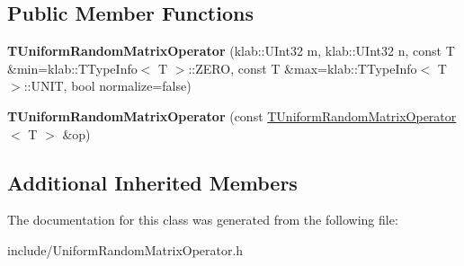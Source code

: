 \subsection*{Public Member Functions}
\begin{DoxyCompactItemize}
\item 
{\bfseries T\+Uniform\+Random\+Matrix\+Operator} (klab\+::\+U\+Int32 m, klab\+::\+U\+Int32 n, const T \&min=klab\+::\+T\+Type\+Info$<$ T $>$\+::Z\+E\+RO, const T \&max=klab\+::\+T\+Type\+Info$<$ T $>$\+::U\+N\+IT, bool normalize=false)\hypertarget{classkl1p_1_1TUniformRandomMatrixOperator_ae97e266b5bee545ed6508b5c6961d57b}{}\label{classkl1p_1_1TUniformRandomMatrixOperator_ae97e266b5bee545ed6508b5c6961d57b}

\item 
{\bfseries T\+Uniform\+Random\+Matrix\+Operator} (const \hyperlink{classkl1p_1_1TUniformRandomMatrixOperator}{T\+Uniform\+Random\+Matrix\+Operator}$<$ T $>$ \&op)\hypertarget{classkl1p_1_1TUniformRandomMatrixOperator_a246d0eb4ee41a59888e44a6eb41d71d8}{}\label{classkl1p_1_1TUniformRandomMatrixOperator_a246d0eb4ee41a59888e44a6eb41d71d8}

\end{DoxyCompactItemize}
\subsection*{Additional Inherited Members}


The documentation for this class was generated from the following file\+:\begin{DoxyCompactItemize}
\item 
include/Uniform\+Random\+Matrix\+Operator.\+h\end{DoxyCompactItemize}
